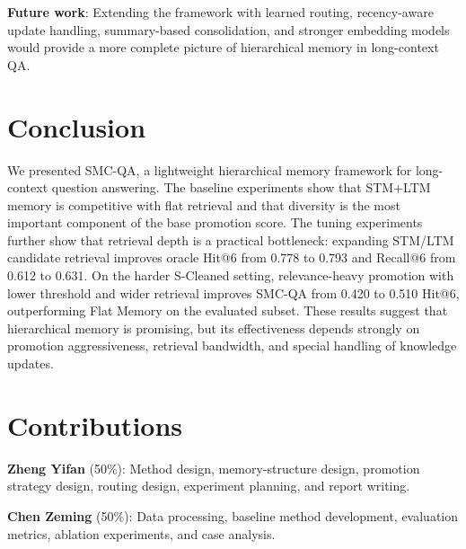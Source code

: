 \documentclass{article}
\begin{document}
\textbf{Future work}: Extending the framework with learned routing, recency-aware update handling, summary-based consolidation, and stronger embedding models would provide a more complete picture of hierarchical memory in long-context QA.

\section{Conclusion}

We presented SMC-QA, a lightweight hierarchical memory framework for long-context question answering. The baseline experiments show that STM+LTM memory is competitive with flat retrieval and that diversity is the most important component of the base promotion score. The tuning experiments further show that retrieval depth is a practical bottleneck: expanding STM/LTM candidate retrieval improves oracle Hit@6 from 0.778 to 0.793 and Recall@6 from 0.612 to 0.631. On the harder S-Cleaned setting, relevance-heavy promotion with lower threshold and wider retrieval improves SMC-QA from 0.420 to 0.510 Hit@6, outperforming Flat Memory on the evaluated subset. These results suggest that hierarchical memory is promising, but its effectiveness depends strongly on promotion aggressiveness, retrieval bandwidth, and special handling of knowledge updates.

\section{Contributions}

\textbf{Zheng Yifan} (50\%): Method design, memory-structure design, promotion strategy design, routing design, experiment planning, and report writing.

\textbf{Chen Zeming} (50\%): Data processing, baseline method development, evaluation metrics, ablation experiments, and case analysis.

\clearpage

\end{document}
